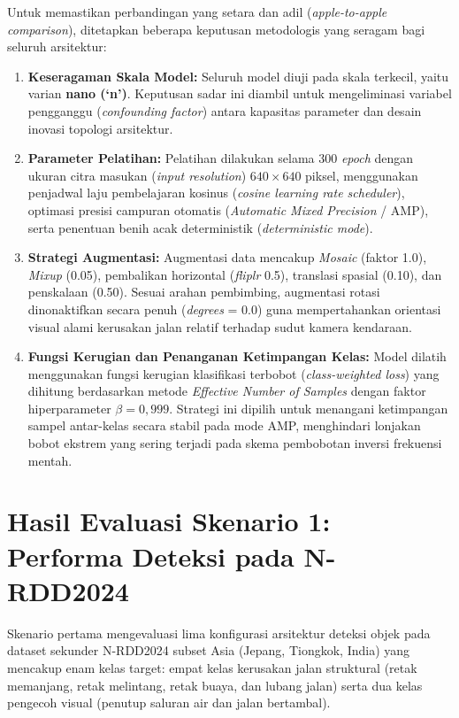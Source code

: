 Untuk memastikan perbandingan yang setara dan adil (\textit{apple-to-apple comparison}), ditetapkan beberapa keputusan metodologis yang seragam bagi seluruh arsitektur:
\begin{enumerate}
	\item \textbf{Keseragaman Skala Model:} Seluruh model diuji pada skala terkecil, yaitu varian \textbf{nano (`n')}. Keputusan sadar ini diambil untuk mengeliminasi variabel pengganggu (\textit{confounding factor}) antara kapasitas parameter dan desain inovasi topologi arsitektur.
	\item \textbf{Parameter Pelatihan:} Pelatihan dilakukan selama 300 \textit{epoch} dengan ukuran citra masukan (\textit{input resolution}) $640 \times 640$ piksel, menggunakan penjadwal laju pembelajaran kosinus (\textit{cosine learning rate scheduler}), optimasi presisi campuran otomatis (\textit{Automatic Mixed Precision} / AMP), serta penentuan benih acak deterministik (\textit{deterministic mode}).
	\item \textbf{Strategi Augmentasi:} Augmentasi data mencakup \textit{Mosaic} (faktor 1.0), \textit{Mixup} (0.05), pembalikan horizontal (\textit{fliplr} 0.5), translasi spasial (0.10), dan penskalaan (0.50). Sesuai arahan pembimbing, augmentasi rotasi dinonaktifkan secara penuh (\textit{degrees} = 0.0) guna mempertahankan orientasi visual alami kerusakan jalan relatif terhadap sudut kamera kendaraan.
	\item \textbf{Fungsi Kerugian dan Penanganan Ketimpangan Kelas:} Model dilatih menggunakan fungsi kerugian klasifikasi terbobot (\textit{class-weighted loss}) yang dihitung berdasarkan metode \textit{Effective Number of Samples} \cite{cui2019class} dengan faktor hiperparameter $\beta = 0,999$. Strategi ini dipilih untuk menangani ketimpangan sampel antar-kelas secara stabil pada mode AMP, menghindari lonjakan bobot ekstrem yang sering terjadi pada skema pembobotan inversi frekuensi mentah.
\end{enumerate}

\section{Hasil Evaluasi Skenario 1: Performa Deteksi pada N-RDD2024}
\label{sec:evaluasi_skenario1}

Skenario pertama mengevaluasi lima konfigurasi arsitektur deteksi objek pada dataset sekunder N-RDD2024 subset Asia (Jepang, Tiongkok, India) yang mencakup enam kelas target: empat kelas kerusakan jalan struktural (retak memanjang, retak melintang, retak buaya, dan lubang jalan) serta dua kelas pengecoh visual (penutup saluran air dan jalan bertambal).

